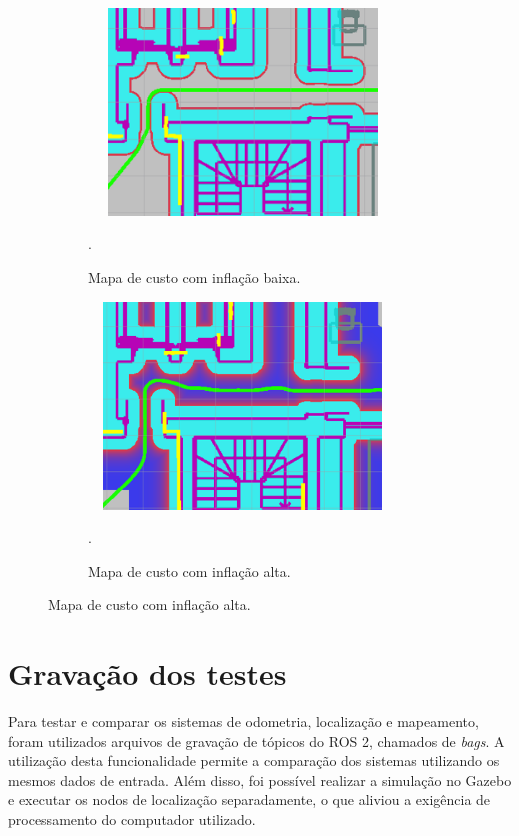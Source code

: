 \documentclass[repeatfields,xlists,xpacks,oneside,yearsonly]{ufrgscca}
\begin{document}
\begin{figure}[h]
    \begin{subfigure}{0.5\linewidth}
    {
        \centering
        \caption{Mapa de custo com inflação baixa.}
        \label{fig:inflation_low}
        \includegraphics[width=0.9\textwidth, height=5.5cm]{costmap_not_inflated.png}\\
    }
    {.}
    \end{subfigure}
    \begin{subfigure}{0.5\linewidth}
    {
        \centering
        \caption{Mapa de custo com inflação alta.}
        \label{fig:inflation_high}
        \includegraphics[width=0.9\textwidth, height=5.5cm]{costmap_inflated.png}\\
    }
    {.}
    \end{subfigure}
\end{figure}

\section{Gravação dos testes}


Para testar e comparar os sistemas de odometria, localização e mapeamento,
foram utilizados arquivos de gravação de tópicos do ROS 2, chamados de 
\textit{bags}.
A utilização desta funcionalidade permite a comparação dos sistemas 
utilizando os mesmos dados de entrada.
Além disso, foi possível realizar a simulação no Gazebo e executar os nodos 
de localização separadamente, o que aliviou a exigência de processamento
do computador utilizado.
\end{document}
